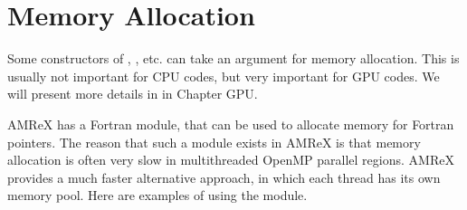 \documentclass[letterpaper,10pt,english]{sphinxmanual}
\begin{document}
\section{Memory Allocation}
\label{\detokenize{Basics:memory-allocation}}
\sphinxAtStartPar
Some constructors of , , etc. can take
an  argument for memory allocation.  This is usually not
important for CPU codes, but very important for GPU codes.  We will
present more details in {\hyperref[\detokenize{GPU:sec-gpu-memory}]{}} in Chapter GPU.

\sphinxAtStartPar
AMReX has a Fortran module,  that can be used to
allocate memory for Fortran pointers. The reason that such a module exists in
AMReX is that memory allocation is often very slow in multi\sphinxhyphen{}threaded OpenMP
parallel regions. AMReX  provides a much faster
alternative approach, in which each thread has its own memory pool. Here are
examples of using the module.

\begin{sphinxVerbatim}[commandchars=\\\{\}]
    
     
         
      
  
\end{sphinxVerbatim}
\end{document}

